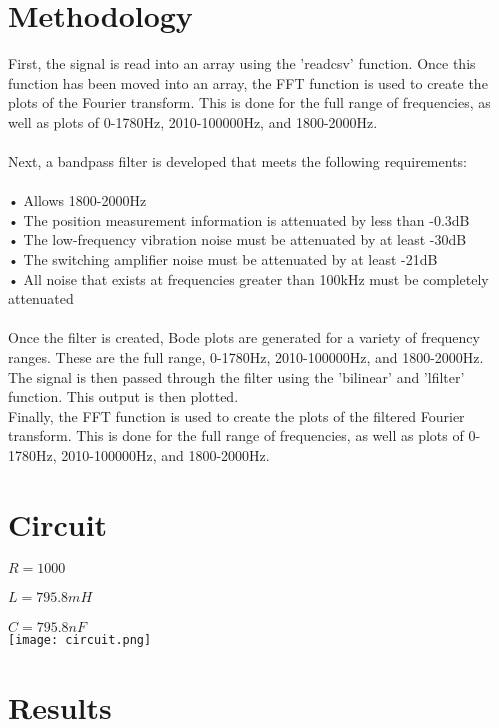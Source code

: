 \documentclass[12pt]{report}
\begin{document}
\section{Methodology}
First, the signal is read into an array using the 'read\textunderscore csv' function. Once this function has been moved into an array, the FFT function is used to create the plots of the Fourier transform. This is done for the full range of frequencies, as well as plots of 0-1780Hz, 2010-100000Hz, and 1800-2000Hz.
\\ \\Next, a bandpass filter is developed that meets the following requirements:
\\ \\• Allows 1800-2000Hz
\\• The position measurement information is attenuated by less than -0.3dB
\\• The low-frequency vibration noise must be attenuated by at least -30dB
\\• The switching amplifier noise must be attenuated by at least -21dB
\\• All noise that exists at frequencies greater than 100kHz must be completely attenuated
\\ \\Once the filter is created, Bode plots are generated for a variety of frequency ranges. These are the full range, 0-1780Hz, 2010-100000Hz, and 1800-2000Hz. The signal is then passed through the filter using the 'bilinear' and 'lfilter' function. This output is then plotted.
\\Finally, the FFT function is used to create the plots of the filtered Fourier transform. This is done for the full range of frequencies, as well as plots of 0-1780Hz, 2010-100000Hz, and 1800-2000Hz.

\section{Circuit}
$R = 1000$
\\ \\$L = 795.8mH$
\\ \\$C = 795.8nF$
\\ \texttt{[image: circuit.png]}

\section{Results}
\end{document}
